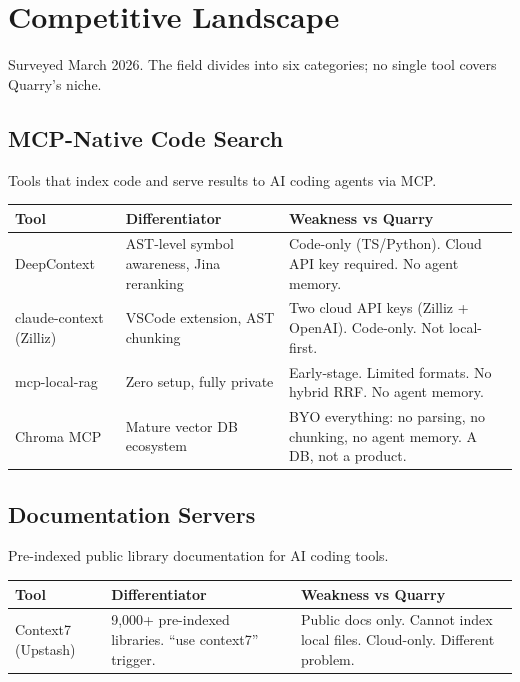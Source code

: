 \documentclass[11pt,letterpaper]{article}
\begin{document}

\newpage
\section*{Competitive Landscape}

Surveyed March 2026. The field divides into six categories; no single tool
covers Quarry's niche.

\subsection*{MCP-Native Code Search}

Tools that index code and serve results to AI coding agents via MCP.

\begin{tabularx}{\textwidth}{@{} l X X @{}}
\toprule
\textbf{Tool} & \textbf{Differentiator} & \textbf{Weakness vs Quarry} \\
\midrule
DeepContext & AST-level symbol awareness, Jina reranking & Code-only (TS/Python). Cloud API key required. No agent memory. \\
claude-context (Zilliz) & VSCode extension, AST chunking & Two cloud API keys (Zilliz + OpenAI). Code-only. Not local-first. \\
mcp-local-rag & Zero setup, fully private & Early-stage. Limited formats. No hybrid RRF. No agent memory. \\
Chroma MCP & Mature vector DB ecosystem & BYO everything: no parsing, no chunking, no agent memory. A DB, not a product. \\
\bottomrule
\end{tabularx}

\subsection*{Documentation Servers}

Pre-indexed public library documentation for AI coding tools.

\begin{tabularx}{\textwidth}{@{} l X X @{}}
\toprule
\textbf{Tool} & \textbf{Differentiator} & \textbf{Weakness vs Quarry} \\
\midrule
Context7 (Upstash) & 9{,}000+ pre-indexed libraries. ``use context7'' trigger. & Public docs only. Cannot index local files. Cloud-only. Different problem. \\
\bottomrule
\end{tabularx}
\end{document}
